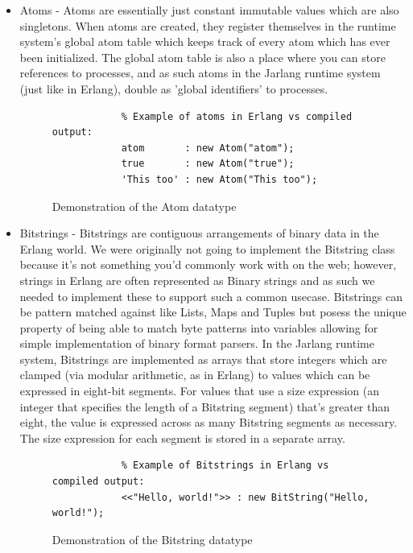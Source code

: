 \documentclass[twoside,12pt,titlepage,a4paper]{article}
\begin{document}
\begin{itemize}
	\item Atoms - Atoms are essentially just constant immutable values which are also singletons. When atoms are created, they register themselves in the runtime system's global atom table which keeps track of every atom which has ever been initialized. The global atom table is also a place where you can store references to processes, and as such atoms in the Jarlang runtime system (just like in Erlang), double as 'global identifiers' to processes.
	\begin{figure}[H]
	\begin{verbatim}
	        % Example of atoms in Erlang vs compiled output:
	        atom       : new Atom("atom");
	        true       : new Atom("true");
	        'This too' : new Atom("This too");
	\end{verbatim}
	\caption{Demonstration of the Atom datatype}
	\end{figure}
	      			
	\item Bitstrings - Bitstrings are contiguous arrangements of binary data in the Erlang world. We were originally not going to implement the Bitstring class because it's not something you'd commonly work with on the web; however, strings in Erlang are often represented as Binary strings and as such we needed to implement these to support such a common usecase. Bitstrings can be pattern matched against like Lists, Maps and Tuples but posess the unique property of being able to match byte patterns into variables allowing for simple implementation of binary format parsers. In the Jarlang runtime system, Bitstrings are implemented as arrays that store integers which are clamped (via modular arithmetic, as in Erlang) to values which can be expressed in eight-bit segments. For values that use a size expression (an integer that specifies the length of a Bitstring segment) that's greater than eight, the value is expressed across as many Bitstring segments as necessary. The size expression for each segment is stored in a separate array.
	\begin{figure}[H]
	\begin{verbatim}
	        % Example of Bitstrings in Erlang vs compiled output:
	        <<"Hello, world!">> : new BitString("Hello, world!");
	\end{verbatim}
	\caption{Demonstration of the Bitstring datatype}
	\end{figure}
	      			

\end{itemize}
\end{document}
